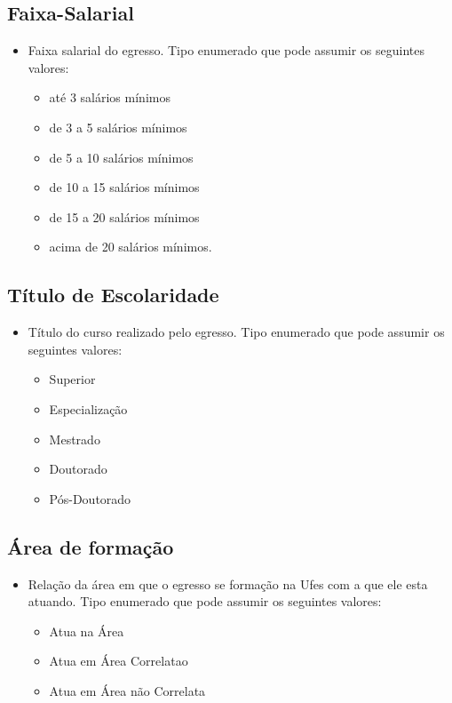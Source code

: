 \subsection{Faixa-Salarial} \label{Faixa-Salarial}

	\begin{itemize}[noitemsep]
	  \item  Faixa salarial do egresso. Tipo enumerado que pode assumir os seguintes valores:
	  	\begin{itemize}[noitemsep]
	  		\item até 3 salários mínimos
	  		\item de 3 a 5 salários mínimos
	  		\item de 5 a 10 salários mínimos
	  		\item de 10 a 15 salários mínimos
	  		\item de 15 a 20 salários mínimos
	  		\item acima de 20 salários mínimos.
		\end{itemize}
	\end{itemize}



\subsection{Título de Escolaridade} \label{Escolaridade}

	\begin{itemize}[noitemsep]
  	\item Título do curso realizado pelo egresso. Tipo enumerado que pode assumir os seguintes valores:
  		\begin{itemize}[noitemsep]
  			\item Superior
  			\item Especialização
  			\item Mestrado
  			\item Doutorado
 	 		\item Pós-Doutorado
		\end{itemize}
	\end{itemize}




\subsection{Área de formação} \label{area-formacao}

	\begin{itemize}[noitemsep]
  	\item Relação da área em que o egresso se formação na Ufes com a que ele esta atuando. Tipo enumerado que pode assumir os seguintes valores:
  		\begin{itemize}[noitemsep]
  			\item Atua na Área
  			\item Atua em Área Correlatao
  			\item Atua em Área não Correlata
		\end{itemize}
	\end{itemize}

